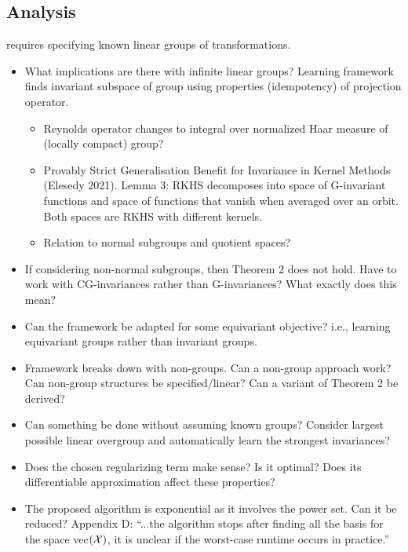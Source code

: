 \subsection{Analysis}

\todo
\parencite{Mouli:2021} requires specifying known linear groups of transformations.
\begin{itemize}

\item
What implications are there with infinite linear groups? Learning framework finds invariant subspace of group using properties (idempotency) of projection operator.
\begin{itemize}
\item
Reynolds operator changes to integral over normalized Haar measure of (locally compact) group? 
\item
Provably Strict Generalisation Benefit for Invariance in Kernel Methods (Elesedy 2021). Lemma 3: RKHS decomposes into space of G-invariant functions and space of functions that vanish when averaged over an orbit. Both spaces are RKHS with different kernels.
\item
Relation to normal subgroups and quotient spaces?
\end{itemize}

\item
If considering non-normal subgroups, then Theorem 2 does not hold. Have to work with CG-invariances rather than G-invariances? What exactly does this mean?

\item
Can the framework be adapted for some equivariant objective? i.e., learning equivariant groups rather than invariant groups.

\item
Framework breaks down with non-groups. Can a non-group approach work? Can non-group structures be specified/linear? Can a variant of Theorem 2 be derived?

\item
Can something be done without assuming known groups? Consider largest possible linear overgroup and automatically learn the strongest invariances?

\item
Does the chosen regularizing term make sense? Is it optimal? Does its differentiable approximation affect these properties?

\item
The proposed algorithm is exponential as it involves the power set. Can it be reduced? Appendix D: ``...the algorithm stops after finding all the basis for the space vec$(\mathcal{X})$, it is unclear if the worst-case runtime occurs in practice.''

\end{itemize}